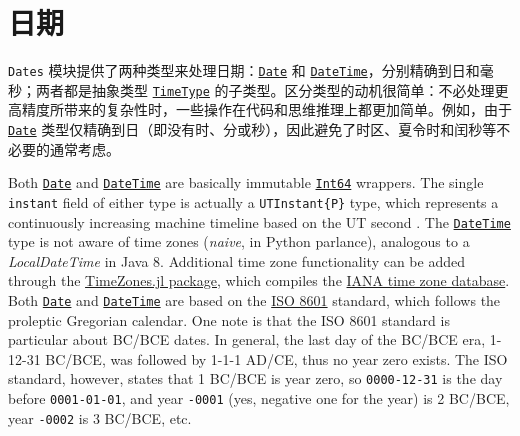 \hypertarget{12670537780554709073}{}


\chapter{日期}





\texttt{Dates} 模块提供了两种类型来处理日期：\hyperlink{4488183467971164548}{\texttt{Date}} 和 \hyperlink{17572689933274889838}{\texttt{DateTime}}，分别精确到日和毫秒；两者都是抽象类型 \hyperlink{4438614350756187528}{\texttt{TimeType}} 的子类型。区分类型的动机很简单：不必处理更高精度所带来的复杂性时，一些操作在代码和思维推理上都更加简单。例如，由于 \hyperlink{4488183467971164548}{\texttt{Date}} 类型仅精确到日（即没有时、分或秒），因此避免了时区、夏令时和闰秒等不必要的通常考虑。



Both \hyperlink{4488183467971164548}{\texttt{Date}} and \hyperlink{17572689933274889838}{\texttt{DateTime}} are basically immutable \hyperlink{7720564657383125058}{\texttt{Int64}} wrappers. The single \texttt{instant} field of either type is actually a \texttt{UTInstant\{P\}} type, which represents a continuously increasing machine timeline based on the UT second \footnotemark[1]. The \hyperlink{17572689933274889838}{\texttt{DateTime}} type is not aware of time zones (\emph{naive}, in Python parlance), analogous to a \emph{LocalDateTime} in Java 8. Additional time zone functionality can be added through the \href{https://github.com/JuliaTime/TimeZones.jl/}{TimeZones.jl package}, which compiles the \href{http://www.iana.org/time-zones}{IANA time zone database}. Both \hyperlink{4488183467971164548}{\texttt{Date}} and \hyperlink{17572689933274889838}{\texttt{DateTime}} are based on the \href{https://en.wikipedia.org/wiki/ISO\_8601}{ISO 8601} standard, which follows the proleptic Gregorian calendar. One note is that the ISO 8601 standard is particular about BC/BCE dates. In general, the last day of the BC/BCE era, 1-12-31 BC/BCE, was followed by 1-1-1 AD/CE, thus no year zero exists. The ISO standard, however, states that 1 BC/BCE is year zero, so \texttt{0000-12-31} is the day before \texttt{0001-01-01}, and year \texttt{-0001} (yes, negative one for the year) is 2 BC/BCE, year \texttt{-0002} is 3 BC/BCE, etc.



